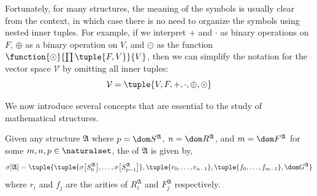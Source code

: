 \vspace{0.3cm}
\noindent
Fortunately, for many structures,
the meaning of the symbols is usually clear from the context,
in which case there is no need to organize the symbols using nested
inner tuples.
For example, if we interpret \( + \) and \( \cdot \) as binary operations on \( F \), \( \oplus \) as a binary operation on \( V \), and \( \odot \) as the
function \( \function{\odot}{\prod \tuple{F, V}}{V} \), then we can simplify the notation for the vector space \( \mathcal{V} \) by omitting all inner tuples:
\begin{equation*}
    \mathcal{V} = \tuple{V, F, +, \cdot, \oplus, \odot}
\end{equation*}

\noindent
We now introduce several concepts that are essential to the study of mathematical structures.

\begin{dfn}[Signature]
    \label{dfn:signature-of-a-structure}
    Given any structure \( \mathfrak{A} \) where \( p = \dom S^{\mathfrak{A}} \), \( n = \dom R^{\mathfrak{A}} \), and \( m = \dom F^{\mathfrak{A}} \)
    for some \( m,n,p \in \naturalset \),
    the  of \( \mathfrak{A} \) is given by,
    \begin{equation*}
        \sigma \mleft[ \mathfrak{A} \mright] =
        \tuple{
            \tuple{\sigma \mleft[ S^{\mathfrak{A}}_{0} \mright],\dots,\sigma \mleft[ S^{\mathfrak{A}}_{p-1} \mright]},
            \tuple{r_{0}, \dots, r_{n-1}},
            \tuple{f_{0}, \dots, f_{m-1}},
            \dom G^{\mathfrak{A}}
        }
    \end{equation*}
    where \( r_{i} \) and \( f_{j} \) are the arities of \( R^{\mathfrak{A}}_{i} \) and \( F^{\mathfrak{A}}_{j} \) respectively.
\end{dfn}

